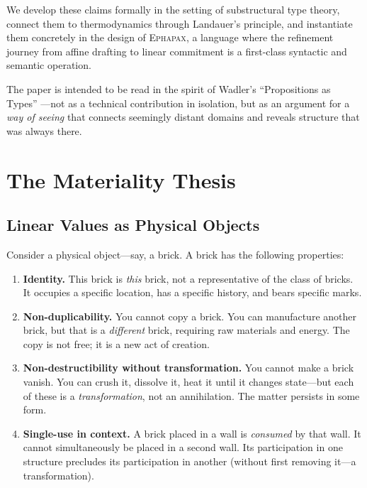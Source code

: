 \documentclass[11pt,a4paper]{article}
\newcommand{\ephapax}{\textsc{Ephapax}}
\begin{document}
We develop these claims formally in the setting of substructural type
theory, connect them to thermodynamics through Landauer's principle,
and instantiate them concretely in the design of \ephapax{}, a
language where the refinement journey from affine drafting to linear
commitment is a first-class syntactic and semantic operation.

The paper is intended to be read in the spirit of Wadler's
``Propositions as Types'' \citep{wadler2015propositions}---not as a
technical contribution in isolation, but as an argument for a
\emph{way of seeing} that connects seemingly distant domains and
reveals structure that was always there.


\section{The Materiality Thesis}
\label{sec:materiality}

\subsection{Linear Values as Physical Objects}

Consider a physical object---say, a brick. A brick has the following
properties:

\begin{enumerate}[label=(\alph*)]
\item \textbf{Identity.} This brick is \emph{this} brick, not a
  representative of the class of bricks. It occupies a specific
  location, has a specific history, and bears specific marks.

\item \textbf{Non-duplicability.} You cannot copy a brick. You can
  manufacture another brick, but that is a \emph{different} brick,
  requiring raw materials and energy. The copy is not free; it is a
  new act of creation.

\item \textbf{Non-destructibility without transformation.} You cannot
  make a brick vanish. You can crush it, dissolve it, heat it until
  it changes state---but each of these is a \emph{transformation},
  not an annihilation. The matter persists in some form.

\item \textbf{Single-use in context.} A brick placed in a wall is
  \emph{consumed} by that wall. It cannot simultaneously be placed
  in a second wall. Its participation in one structure precludes its
  participation in another (without first removing it---a
  transformation).
\end{enumerate}
\end{document}
